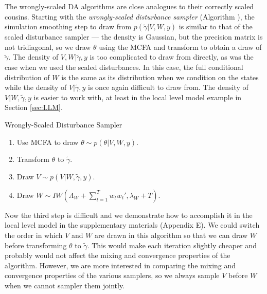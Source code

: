 \documentclass[12pt]{article}
\begin{document}
The wrongly-scaled DA algorithms are close analogues to their correctly scaled cousins. Starting with the {\it wrongly-scaled disturbance sampler} (Algorithm ), the simulation smoothing step to draw from $p(\tilde{\gamma}|V,W,y)$ is similar to that of the scaled disturbance sampler --- the density is Gaussian, but the precision matrix is not tridiagonal, so we draw $\theta$ using the MCFA and transform to obtain a draw of $\tilde{\gamma}$. The density of $V,W|\tilde{\gamma},y$ is too complicated to draw from directly, as was the case when we used the scaled disturbances. In this case, the full conditional distribution of $W$ is the same as its distribution when we condition on the states while the density of $V|\tilde{\gamma},y$ is once again difficult to draw from. The density of $V|W,\tilde{\gamma},y$ is easier to work with, at least in the local level model example in Section \ref{sec:LLM}. 
\begin{alg*}[WSD]Wrongly-Scaled Disturbance Sampler\label{alg:DLMwdist}
\begin{enumerate}
\item Use MCFA to draw $\theta \sim p(\theta|V,W,y)$.
\item Transform $\theta$ to $\tilde{\gamma}$.
\item Draw $V \sim p(V|W,\tilde{\gamma},y)$.
\item Draw $W \sim IW\left(\Lambda_W + \sum_{t=1}^Tw_tw_t',\lambda_{W} + T\right)$.
\end{enumerate}
\end{alg*}\noindent
Now the third step is difficult and we demonstrate how to accomplish it in the local level model in the supplementary materials (Appendix E). We could switch the order in which $V$ and $W$ are drawn in this algorithm so that we can draw $W$ before transforming $\theta$ to $\tilde{\gamma}$. This would make each iteration slightly cheaper and probably would not affect the mixing and convergence properties of the algorithm. However, we are more interested in comparing the mixing and convergence properties of the various samplers, so we always sample $V$ before $W$ when we cannot sampler them jointly.
\end{document}
